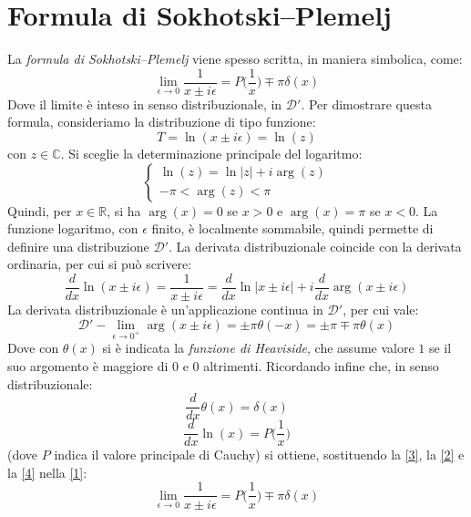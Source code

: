 \chapter{Formula di Sokhotski–Plemelj}%
\noindent
La \emph{formula di Sokhotski–Plemelj} viene spesso scritta, in maniera simbolica, come:
\begin{equation}
 \lim_{\epsilon \rightarrow 0}\frac{1}{x\pm i\epsilon} = P\Big(\frac{1}{x}\Big) \mp \pi\delta(x)
\end{equation}
Dove il limite è inteso in senso distribuzionale, in $\mathscr{D}'$.
Per dimostrare questa formula, consideriamo la distribuzione di tipo funzione:
\begin{equation}
T = \ln(x\pm i\epsilon) = \ln(z)
\end{equation}
con $z \in \mathbb{C}$. Si sceglie la determinazione principale del logaritmo:
\begin{displaymath}
\left\{
\begin{array}{l}
\ln(z) = \ln|z| + i\arg(z) \\
-\pi<\arg(z)<\pi
\end{array}
\right.
\end{displaymath} 
Quindi, per $x\in\mathbb{R}$, si ha $\arg(x) = 0$ se $x>0$ e $\arg(x) = \pi$ se $x<0$. 
La funzione logaritmo, con $\epsilon$ finito, è localmente sommabile, quindi permette di definire una distribuzione $\mathscr{D}'$.
La derivata distribuzionale coincide con la derivata ordinaria, per cui si può scrivere:
\begin{equation}\label{1}
 \frac{d}{dx}\ln(x\pm i\epsilon) = \frac{1}{x\pm i\epsilon} =  \frac{d}{dx}\ln|x\pm i\epsilon| +i\frac{d}{dx}\arg(x\pm i\epsilon)
\end{equation}
La derivata distribuzionale è un'applicazione continua in $\mathscr{D}'$, per cui vale:
\begin{equation}\label{2}
\mathscr{D}'-\lim_{\epsilon\rightarrow0^+}\arg(x\pm i\epsilon) = \pm\pi\theta(-x) = \pm\pi\mp\pi\theta(x)
\end{equation}
Dove con $\theta(x)$ si è indicata la \emph{funzione di Heaviside}, che assume valore $1$ se il suo argomento è maggiore di $0$ e $0$ altrimenti.
Ricordando infine che, in senso distribuzionale:
\begin{equation}\label{4}
 \frac{d}{dx} \theta(x) = \delta(x) 
\end{equation}
\begin{equation}\label{3}
 \frac{d}{dx} \ln(x) = P\Big(\frac{1}{x}\Big) 
\end{equation}
(dove $P$ indica il valore principale di Cauchy) si ottiene, sostituendo la \eqref{3}, la \eqref{2} e la \eqref{4} nella \eqref{1}:
\begin{equation}
  \lim_{\epsilon \rightarrow 0}\frac{1}{x\pm i\epsilon} = P\Big(\frac{1}{x}\Big) \mp \pi\delta(x)
\end{equation}





